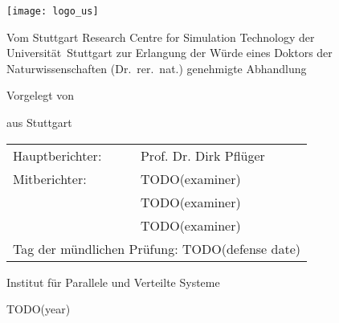
\begin{titlepage}
  \begin{center}
    \setlength{\parindent}{0pt}
    
    \texttt{[image: logo\_us]}
    
    \vfill
    
    {\textbf{\LARGE\thetitle}\par}
    
    \vfill
    
    Vom Stuttgart Research Centre for Simulation Technology der
    Universität~Stuttgart zur Erlangung der Würde eines Doktors der
    Naturwissenschaften (Dr.~rer.~nat.) genehmigte Abhandlung
    
    \vfill
    
    Vorgelegt von
    
    \vspace{1mm}
    
    \textbf{\large\theauthor}
    
    aus Stuttgart
    
    \vfill
    
    \begin{tabular}{ll}
      Hauptberichter:&
      Prof. Dr. Dirk Pflüger\\
      Mitberichter:&
      TODO(examiner)\\
      &TODO(examiner)\\
      &TODO(examiner)\\[5mm]
      \multicolumn{2}{l}{%
        Tag der mündlichen Prüfung:\quad
        TODO(defense date)%
      }
    \end{tabular}
    
    \vfill
    
    Institut für Parallele und Verteilte Systeme
    
    \vspace{5mm}
    
    TODO(year)
  \end{center}
\end{titlepage}


